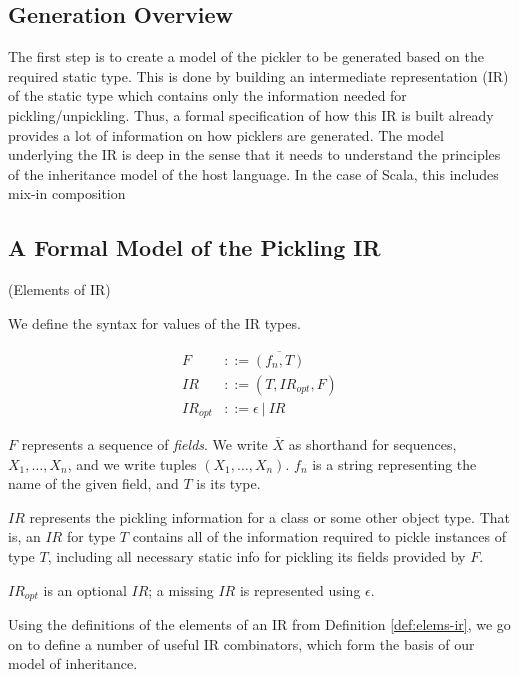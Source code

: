\documentclass[preprint,10pt]{sigplanconf}
\theoremstyle{definition}
\begin{document}
\subsection{Generation Overview}

The first step is to create a model of the pickler to be generated based on
the required static type. This is done by building an intermediate
representation (IR) of the static type which contains only the information
needed for pickling/unpickling. Thus, a formal specification of how this IR is
built already provides a lot of information on how picklers are generated. The
model underlying the IR is deep in the sense that it needs to understand the
principles of the inheritance model of the host language. In the case of
Scala, this includes mix-in composition~\cite{Odersky2005}

\subsection{A Formal Model of the Pickling IR}

\begin{defn}{(Elements of IR)}

We define the syntax for values of the IR types.

\begin{align*}
F&        ::= \overline{(f_n, T)}\\
IR&       ::= (T, IR_{opt}, F)\\
IR_{opt}& ::= \epsilon~|~IR
\end{align*}

$F$ represents a sequence of \textit{fields}. We write $\overline{X}$ as
shorthand for sequences, $X_1,\dots,X_n$, and we write tuples
$(X_1,\dots,X_n)$. $f_n$ is a string representing the name of the given field,
and $T$ is its type.

$IR$ represents the pickling information for a class or some other object
type. That is, an $IR$ for type $T$ contains all of the information required
to pickle instances of type $T$, including all necessary static info for
pickling its fields provided by $F$.

$IR_{opt}$ is an optional $IR$; a missing $IR$ is represented using $\epsilon$.
\end{defn}
\label{def:elems-ir}

Using the definitions of the elements of an IR from Definition \ref{def:elems-ir},
we go on to define a number of useful IR combinators, which form the
basis of our model of inheritance.
\end{document}
